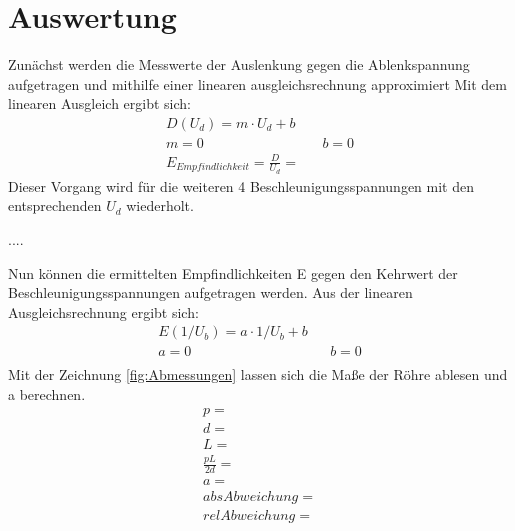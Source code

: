 \section{Auswertung}
\label{sec:Auswertung}
Zunächst werden die Messwerte der Auslenkung gegen die Ablenkspannung aufgetragen und mithilfe einer linearen ausgleichsrechnung approximiert
Mit dem linearen Ausgleich ergibt sich:
\begin{align}
    D(U_d) = m\cdot U_d + b  \nonumber \\
    m = 0 && b = 0 \\
    E_{Empfindlichkeit} = \frac{D}{U_d} = 
\end{align}
Dieser Vorgang wird für die weiteren 4 Beschleunigungsspannungen mit den entsprechenden $U_d$ wiederholt.

....%

Nun können  die ermittelten Empfindlichkeiten E gegen den Kehrwert der Beschleunigungsspannungen aufgetragen werden.
Aus der linearen Ausgleichsrechnung ergibt sich:
\begin{align}
    E(1/U_b) = a\cdot 1/U_b + b  \nonumber \\
    a = 0 && b = 0 \\ 
\end{align}
Mit der Zeichnung \ref{fig:Abmessungen} lassen sich die Maße der Röhre ablesen und a berechnen.
\begin{align}
    p = \\
    d = \\
    L = \\
    \frac{pL}{2d} = \\
    a = \\
    abs Abweichung = \\
    rel Abweichung = \\
\end{align}
